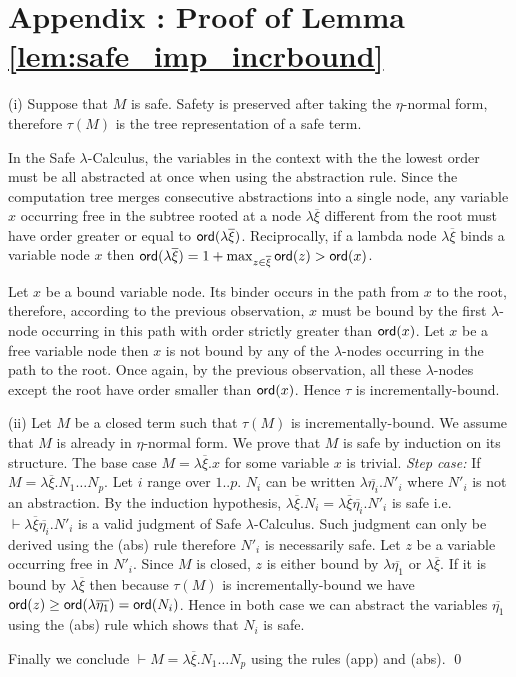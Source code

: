 \documentclass{llncs}
\newcommand\ord[1]{{\sf ord}(#1)}
\begin{document}
\section*{Appendix : Proof of Lemma \ref{lem:safe_imp_incrbound}}
(i) Suppose that $M$ is safe. Safety is preserved after
taking the $\eta$-normal form, therefore $\tau(M)$ is the tree representation of a safe term.

In the Safe $\lambda$-Calculus, the variables in the context with the the lowest order must be all abstracted
at once when using the abstraction rule. Since the computation
tree merges consecutive abstractions into a single node,
any variable $x$ occurring free in the subtree rooted at a node $\lambda \overline{\xi}$ different from the root
must have order greater or equal to $\ord{\lambda \overline{\xi}}$. Reciprocally, if a lambda node
$\lambda \overline{\xi}$ binds a variable node $x$ then
$\ord{\lambda \overline{\xi}} = 1+\max_{z\in\overline{\xi}} \ord{z} > \ord{x}$.

Let $x$ be a bound variable node. Its binder occurs in the path from $x$
to the root, therefore, according to the previous observation, $x$ must be bound
by the first $\lambda$-node occurring in this path with order strictly
greater than $\ord{x}$. Let $x$ be a free variable node then $x$ is not bound
by any of the $\lambda$-nodes occurring in the path to the root. Once again, by the previous observation, all
these $\lambda$-nodes except the root have order smaller than $\ord{x}$. Hence
$\tau$ is incrementally-bound.

(ii) Let $M$ be a closed term such that $\tau(M)$ is incrementally-bound.
We assume that $M$ is already in $\eta$-normal form.
We prove that $M$ is safe by induction on its structure. The base case $M =
\lambda \overline{\xi} . x$ for some variable $x$ is trivial.
\emph{Step case:} If $M = \lambda \overline{\xi} . N_1 \ldots N_p$.
Let $i$ range over $1..p$. $N_i$ can be written $\lambda
\overline{\eta_i} . N'_i$ where $N'_i$ is not an abstraction. By the
induction hypothesis, $\lambda \overline{\xi} . N_i = \lambda
\overline{\xi} \overline{\eta_i} . N'_i$ is safe i.e.
$\vdash \lambda \overline{\xi} \overline{\eta_i} . N'_i$
is a valid judgment of Safe $\lambda$-Calculus.
Such judgment can only be derived using the (abs) rule therefore
$N'_i$ is necessarily safe. Let $z$ be a variable occurring free in
$N'_i$. Since $M$ is closed, $z$ is either bound by $\lambda
\overline{\eta_1}$ or $\lambda \overline{\xi}$. If it is bound by
$\lambda \overline{\xi}$ then because $\tau(M)$ is
incrementally-bound we have $\ord{z} \geq \ord{\lambda
\overline{\eta_1}} = \ord{N_i}$. Hence in both case we can abstract the variables
$\overline{\eta_1}$ using the (abs) rule which shows that $N_i$ is safe.

Finally we conclude $\vdash M = \lambda \overline{\xi} . N_1 \ldots N_p$ using the
rules (app) and (abs).
\qed
\end{document}
